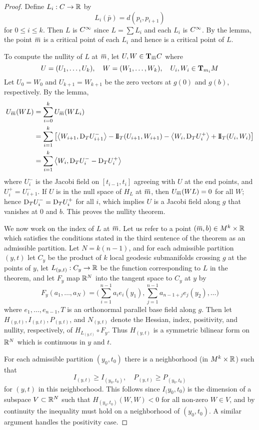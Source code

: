 \documentclass[../main]{subfiles}
\begin{document}
\begin{proof}
Define $L_i:C\functionMaps\bR$ by
\[L_i(\bar p) = d(p_i,p_{i+1})\]
for $0\le i\le k$. Then $L$ is $\CInfty$ since  $L=\sum L_i$ and each $L_i$ is $\CInfty$. By the lemma, the point $\xoverline m$ is a critical point of each $L_i$ and hence is a critical point of $L$.

To compute the nullity of $L$ at $\xoverline m$, let $U,W\in\ts{C}{\xoverline m}$ where \[U=(U_1,\ldots,U_k),
\quad W=(W_1,\ldots,W_k),
\quad U_i,W_i\in\ts{M}{m_i}\]
Let $U_0=W_0$ and $U_{k+1}=W_{k+1}$ be the zero vectors at $g(0)$ and $g(b)$, respectively. By the lemma,
\begin{align*}
    U_{\xoverline m}(WL) &= \sum_{i=0}^k U_{\xoverline m}(WL_i) \\
    &= \sum_{i=1}^k\sbr{\ip{W_{i+1}}{\D_TU_{i+1}^-} - \secondForm_T(U_{i+1},W_{i+1}) - \ip{W_i}{\D_TU_i^+} + \secondForm_T(U_i,W_i)} \\
    &=\sum_{i=1}^k\ip{W_i}{\D_TU_i^- - \D_TU_i^+}
\end{align*}
where $U_i^-$ is the Jacobi field on $[t_{i-1},t_i]$ agreeing with $U$ at the end points, and $U_i^+=U_{i+1}^-$. If $U$ is in the null space of $H_L$ at $\xoverline m$, then $U_{\xoverline m}(WL)=0$ for all $W$; hence $\D_TU_i^-=\D_TU_i^+$ for all $i$, which implies $U$ is a Jacobi field along $g$ that vanishes at 0 and $b$. This proves the nullity theorem.

We now work on the index of $L$ at $\xoverline m$. Let us refer to a point $(\xoverline m,b)\in M^k\times\bR$ which satisfies the conditions stated in the third sentence of the theorem as an admissible partition. Let $N=k(n-1)$, and for each admissible partition $(y,t)$ let $C_y$ be the product of $k$ local geodesic submanifolds crossing $g$ at the points of $y$, let $L_{(y,t)}:C_y\functionMaps\bR$ be the function corresponding to $L$ in the theorem, and let $F_y$ map $\bR^N$ into the tangent space to $C_y$ at $y$ by
\[F_y(a_1,\ldots,a_N) = \bigg(\sum_{i=1}^{n-1}a_ie_i(y_1),\sum_{j=1}^{n-1}a_{n-1+j}e_j(y_2),\ldots\bigg)\]
where $e_1,\ldots,e_{n-1},T$ is an orthonormal parallel base field along $g$. Then let $H_{(y,t)},I_{(y,t)},P_{(y,t)}$, and $N_{(y,t)}$ denote the Hessian, index, positivity, and nullity, respectively, of $H_{L_{(y,t)}}\circ F_y$. Thus $H_{(y,t)}$ is a symmetric bilinear form on $\bR^N$ which is continuous in $y$ and $t$.

For each admissible partition $(y_0,t_0)$ there is a neighborhood (in $M^k\times\bR$) such that
\begin{equation} \tag{11}\label{eqn:ch10.4.2}
I_{(y,t)} \ge I_{(y_0,t_0)},
\quad P_{(y,t)} \ge P_{(y_0,t_0)}
\end{equation}
for $(y,t)$ in this neighborhood. This follows since $I_({y_0,t_0)}$ is the dimension of a subspace $V\subset\bR^N$ such that $H_{(y_0,t_0)}(W,W)<0$ for all non-zero $W\in V$, and by continuity the inequality must hold on a neighborhood of $(y_0,t_0)$. A similar argument handles the positivity case.


\end{proof}
\end{document}
